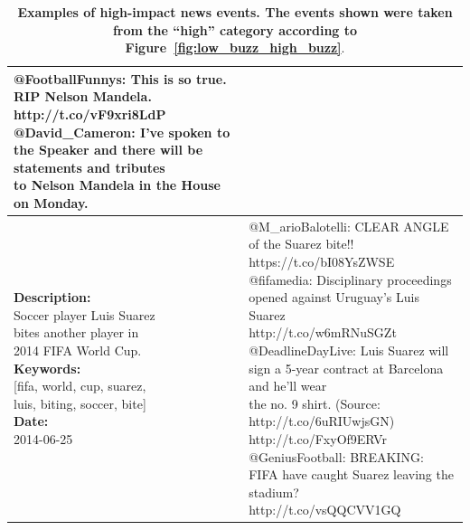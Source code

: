 \documentclass[10pt,letterpaper]{article}
\begin{document}
\begin{table}
{\begin{tabular*}{1\linewidth}{p{5cm}p{5cm}}
{        @FootballFunnys: This is so true. RIP Nelson Mandela. http://t.co/vF9xri8LdP\vspace{.1cm}\\
        @David\_Cameron: I've spoken to the Speaker and there will be statements and tributes \\to Nelson Mandela in the House on Monday.} \\
      \hline
      \pbox{20cm}{\textbf{Description:}\\ Soccer player Luis Suarez\\ bites another player in\\ 2014 FIFA World Cup. \vspace{.1cm}\\
        \textbf{Keywords:}\\ {[}fifa, world, cup, suarez,\\ luis, biting, soccer, bite{]}\vspace{.1cm}\\
        \textbf{Date:}\\ 2014-06-25}
      & \pbox{20cm}{
        @M\_arioBalotelli: CLEAR ANGLE of the Suarez bite!!  https://t.co/bI08YsZWSE\vspace{.1cm}\\
        @fifamedia: Disciplinary proceedings opened against Uruguay's Luis Suarez\\ http://t.co/w6mRNuSGZt\vspace{.1cm}\\
        @DeadlineDayLive: Luis Suarez will sign a 5-year contract at Barcelona and he'll wear \\the no. 9 shirt. (Source: http://t.co/6uRIUwjsGN) http://t.co/FxyOf9ERVr\vspace{.1cm}\\
        @GeniusFootball: BREAKING: FIFA have caught Suarez leaving the stadium?\\ http://t.co/vsQQCVV1GQ} \\
      \hline
    \end{tabular*}
  }
  \caption{\textbf{Examples of high-impact news events. The events
      shown were taken from the ``high'' category according to Figure~\ref{fig:low_buzz_high_buzz}}.}
  \label{table:high-impact-sample}
\end{table}
\end{document}
